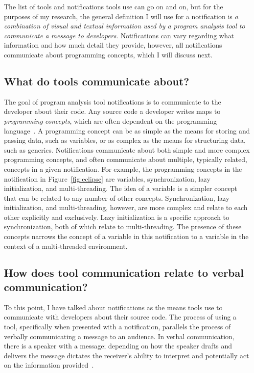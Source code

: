 \documentclass{llncs}
\begin{document}
The list of tools and notifications tools use can go on and on, but for the purposes of my research, the general definition I will use for a notification is \emph{a combination of visual and textual information used by a program analysis tool to communicate a message to developers.} Notifications can vary regarding what information and how much detail they provide, however, all notifications communicate about programming concepts, which I will discuss next.

\subsection{What do tools communicate about?}

The goal of program analysis tool notifications is to communicate to the developer about their code. Any source code a developer writes maps to \emph{programming concepts}, which are often dependent on the programming language~\cite{jazayeri1997programming}. A programming concept can be as simple as the means for storing and passing data, such as variables, or as complex as the means for structuring data, such as generics. Notifications communicate about both simple and more complex programming concepts, and often communicate about multiple, typically related, concepts in a given notification. For example, the programming concepts in the notification in Figure~\ref{fig:eclipse} are variables, synchronization, lazy initialization, and multi-threading. The idea of a variable is a simpler concept that can be related to any number of other concepts. Synchronization, lazy initialization, and multi-threading, however, are more complex and relate to each other explicitly and exclusively. Lazy initialization is a specific approach to synchronization, both of which relate to multi-threading. The presence of these concepts narrows the concept of a variable in this notification to a variable in the context of a multi-threaded environment. 


\subsection{How does tool communication relate to verbal communication?}
To this point, I have talked about notifications as the means tools use to communicate with developers about their source code.
The process of using a tool, specifically when presented with a notification, parallels the process of verbally communicating a message to an audience.
In verbal communication, there is a speaker with a message; depending on how the speaker drafts and delivers the message dictates the receiver's ability to interpret and potentially act on the information provided~\cite{mustajoki2008modelling,bowman1987modeling}.
\end{document}
